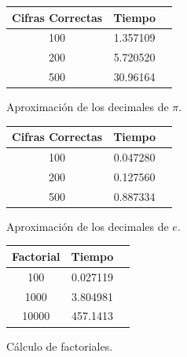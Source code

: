 \documentclass[a4paper,10pt,twocolumn]{article}
\begin{document}
	\begin{figure}[h!]%
		\begin{center}
			\begin{tabular}{|c|c|c|} \hline
			 	Cifras Correctas & Tiempo 	\\ \hline
			    100              &  1.357109 \\ \hline  
			    200              &  5.720520  \\ \hline
				500              &  30.96164  \\ \hline

\end{tabular}
		\caption{Aproximación de los decimales de $\pi$. \label{fig:ex}}
		\end{center}
	\end{figure}
	
	\begin{figure}[h!]%
		\begin{center}
			\begin{tabular}{|c|c|c|} \hline
			 	Cifras Correctas & Tiempo 	\\ \hline
			    100              &  0.047280 \\ \hline  
			    200              &  0.127560  \\ \hline
				500              &  0.887334  \\ \hline

\end{tabular}
		\caption{Aproximación de los decimales de $e$. \label{fig:ex}}
		\end{center}
	\end{figure}
	
	\begin{figure}[h!]%
		\begin{center}
			\begin{tabular}{|c|c|c|} \hline
			 	Factorial & Tiempo 	\\ \hline
			    100              &  0.027119 \\ \hline  
			    1000             &  3.804981  \\ \hline
				10000            &  457.1413  \\ \hline

\end{tabular}
		\caption{Cálculo de factoriales. \label{fig:ex}}
		\end{center}
	\end{figure}

\end{document}
